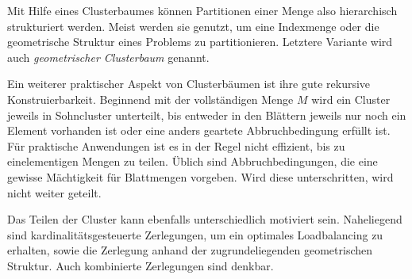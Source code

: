       Mit Hilfe eines Clusterbaumes können Partitionen einer Menge also hierarchisch strukturiert werden. Meist werden sie genutzt, um eine Indexmenge oder
      die geometrische Struktur eines Problems zu partitionieren. Letztere Variante wird auch \textit{geometrischer Clusterbaum} genannt. 
      
      Ein weiterer praktischer Aspekt
      von Clusterbäumen ist ihre gute rekursive Konstruierbarkeit. Beginnend mit der vollständigen Menge $M$ wird ein Cluster jeweils in Sohncluster unterteilt,
      bis entweder in den Blättern jeweils nur noch ein Element vorhanden ist oder eine anders geartete Abbruchbedingung erfüllt ist. Für praktische Anwendungen ist
      es in der Regel nicht effizient, bis zu einelementigen Mengen zu teilen. Üblich sind Abbruchbedingungen, die eine gewisse Mächtigkeit für Blattmengen vorgeben.
      Wird diese unterschritten, wird nicht weiter geteilt. 
      
      Das Teilen der Cluster kann ebenfalls unterschiedlich motiviert sein. Naheliegend sind kardinalitätsgesteuerte Zerlegungen, um ein optimales Loadbalancing zu erhalten,
      sowie die Zerlegung anhand der zugrundeliegenden geometrischen Struktur. Auch kombinierte Zerlegungen sind denkbar.
      

